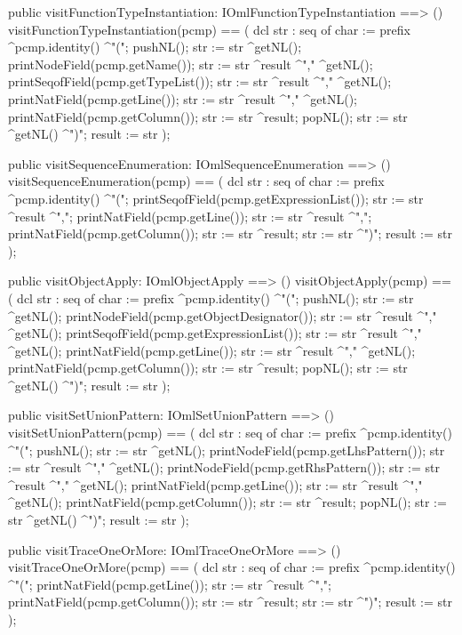\begin{vdm_al}
  public visitFunctionTypeInstantiation: IOmlFunctionTypeInstantiation ==> ()
  visitFunctionTypeInstantiation(pcmp) ==
    ( dcl str : seq of char := prefix ^pcmp.identity() ^"(";
      pushNL();
      str := str ^getNL();
      printNodeField(pcmp.getName());
      str := str ^result ^"," ^getNL();
      printSeqofField(pcmp.getTypeList());
      str := str ^result ^"," ^getNL();
      printNatField(pcmp.getLine());
      str := str ^result ^"," ^getNL();
      printNatField(pcmp.getColumn());
      str := str ^result;
      popNL();
      str := str ^getNL() ^")";
      result := str );

  public visitSequenceEnumeration: IOmlSequenceEnumeration ==> ()
  visitSequenceEnumeration(pcmp) ==
    ( dcl str : seq of char := prefix ^pcmp.identity() ^"(";
      printSeqofField(pcmp.getExpressionList());
      str := str ^result ^",";
      printNatField(pcmp.getLine());
      str := str ^result ^",";
      printNatField(pcmp.getColumn());
      str := str ^result;
      str := str ^")";
      result := str );

  public visitObjectApply: IOmlObjectApply ==> ()
  visitObjectApply(pcmp) ==
    ( dcl str : seq of char := prefix ^pcmp.identity() ^"(";
      pushNL();
      str := str ^getNL();
      printNodeField(pcmp.getObjectDesignator());
      str := str ^result ^"," ^getNL();
      printSeqofField(pcmp.getExpressionList());
      str := str ^result ^"," ^getNL();
      printNatField(pcmp.getLine());
      str := str ^result ^"," ^getNL();
      printNatField(pcmp.getColumn());
      str := str ^result;
      popNL();
      str := str ^getNL() ^")";
      result := str );

  public visitSetUnionPattern: IOmlSetUnionPattern ==> ()
  visitSetUnionPattern(pcmp) ==
    ( dcl str : seq of char := prefix ^pcmp.identity() ^"(";
      pushNL();
      str := str ^getNL();
      printNodeField(pcmp.getLhsPattern());
      str := str ^result ^"," ^getNL();
      printNodeField(pcmp.getRhsPattern());
      str := str ^result ^"," ^getNL();
      printNatField(pcmp.getLine());
      str := str ^result ^"," ^getNL();
      printNatField(pcmp.getColumn());
      str := str ^result;
      popNL();
      str := str ^getNL() ^")";
      result := str );

  public visitTraceOneOrMore: IOmlTraceOneOrMore ==> ()
  visitTraceOneOrMore(pcmp) ==
    ( dcl str : seq of char := prefix ^pcmp.identity() ^"(";
      printNatField(pcmp.getLine());
      str := str ^result ^",";
      printNatField(pcmp.getColumn());
      str := str ^result;
      str := str ^")";
      result := str );


\end{vdm_al}
